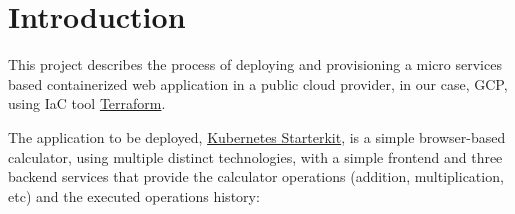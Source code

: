 \documentclass[12pt,a4paper,oneside]{report}
\begin{document}
\pagestyle{plain}

\cleardoublepage
\tableofcontents
\clearpage 
\begingroup 
    \let\clearpage\relax
    \let\cleardoublepage\relax
    \let\cleardoublepage\relax
\listoftables
\listoffigures
\endgroup
\chapter*{\tlangAcronyms}
\begin{acronym}[NGOSS]
\end{acronym}
\setcounter{page}{1}
%
%
\chapter{Introduction}
\label{chapter:introduction}
This project describes the process of deploying and provisioning a micro services based containerized web application in a public cloud provider, in our case, \ac{GCP}, using \ac{IaC} tool \href{https://www.terraform.io/}{Terraform}.

The application to be deployed, \href{https://github.com/khandelwal-arpit/kubernetes-starterkit}{Kubernetes Starterkit}, is a simple browser-based calculator, using multiple distinct technologies, with a simple frontend and 
three backend services that provide the calculator operations (addition, multiplication, etc) and the executed operations history:
\end{document}
